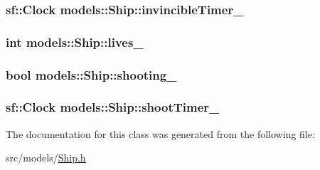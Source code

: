\hypertarget{classmodels_1_1Ship_a9cb7f675d84df220454d5bc946457174}{
\subsubsection[{invincible\-Timer\-\_\-}]{\setlength{\rightskip}{0pt plus 5cm}sf\-::\-Clock {\bf models\-::\-Ship\-::invincible\-Timer\-\_\-}}}\label{d0/d37/classmodels_1_1Ship_a9cb7f675d84df220454d5bc946457174}
\hypertarget{classmodels_1_1Ship_aeaaf9231898ee877f11000788806409a}{
\subsubsection[{lives\-\_\-}]{\setlength{\rightskip}{0pt plus 5cm}int {\bf models\-::\-Ship\-::lives\-\_\-}}}\label{d0/d37/classmodels_1_1Ship_aeaaf9231898ee877f11000788806409a}
\hypertarget{classmodels_1_1Ship_ac9326d94309c9c1a649076aba1c9fc4f}{
\subsubsection[{shooting\-\_\-}]{\setlength{\rightskip}{0pt plus 5cm}bool {\bf models\-::\-Ship\-::shooting\-\_\-}}}\label{d0/d37/classmodels_1_1Ship_ac9326d94309c9c1a649076aba1c9fc4f}
\hypertarget{classmodels_1_1Ship_a286ba7211706245e5b7a6315a26edf57}{
\subsubsection[{shoot\-Timer\-\_\-}]{\setlength{\rightskip}{0pt plus 5cm}sf\-::\-Clock {\bf models\-::\-Ship\-::shoot\-Timer\-\_\-}}}\label{d0/d37/classmodels_1_1Ship_a286ba7211706245e5b7a6315a26edf57}


\-The documentation for this class was generated from the following file\-:\begin{DoxyCompactItemize}
\item 
src/models/\hyperlink{Ship_8h}{\-Ship.\-h}\end{DoxyCompactItemize}
